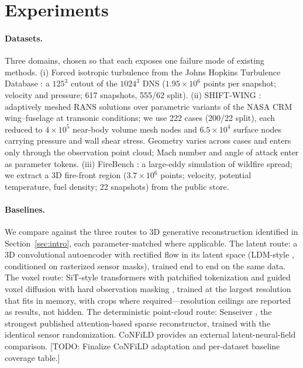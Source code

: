 \documentclass{article} %
\newcommand{\todo}[1]{{\color{red}[TODO: #1]}}
\begin{document}
\section{Experiments}
\label{sec:results}

\paragraph{Datasets.}
Three domains, chosen so that each exposes one failure mode of existing methods. (i) Forced isotropic turbulence from the Johns Hopkins Turbulence Database \citep{li2008public}: a $125^3$ cutout of the $1024^3$ DNS ($1.95\times10^{6}$ points per snapshot; velocity and pressure; 617 snapshots, 555/62 split). (ii) SHIFT-WING \citep{luminary2026shiftwing}: adaptively meshed RANS solutions over parametric variants of the NASA CRM wing--fuselage at transonic conditions; we use 222 cases (200/22 split), each reduced to $4\times10^{5}$ near-body volume mesh nodes and $6.5\times10^{4}$ surface nodes carrying pressure and wall shear stress. Geometry varies across cases and enters only through the observation point cloud; Mach number and angle of attack enter as parameter tokens. (iii) FireBench \citep{firebench2024}: a large-eddy simulation of wildfire spread; we extract a 3D fire-front region ($3.7\times10^{6}$ points; velocity, potential temperature, fuel density; 22 snapshots) from the public store.

\paragraph{Baselines.}
We compare against the three routes to 3D generative reconstruction identified in Section~\ref{sec:intro}, each parameter-matched where applicable. The latent route: a 3D convolutional autoencoder with rectified flow in its latent space (LDM-style \citep{rombach2022high}, conditioned on rasterized sensor masks), trained end to end on the same data. The voxel route: SiT-style transformers with patchified tokenization \citep{ma2024sit,peebles2023dit} and guided voxel diffusion with hard observation masking \citep{amoros2026guiding}, trained at the largest resolution that fits in memory, with crops where required---resolution ceilings are reported as results, not hidden. The deterministic point-cloud route: Senseiver \citep{santos2023senseiver}, the strongest published attention-based sparse reconstructor, trained with the identical sensor randomization. CoNFiLD \citep{du2024confild} provides an external latent-neural-field comparison. \todo{Finalize CoNFiLD adaptation and per-dataset baseline coverage table.}
\end{document}
